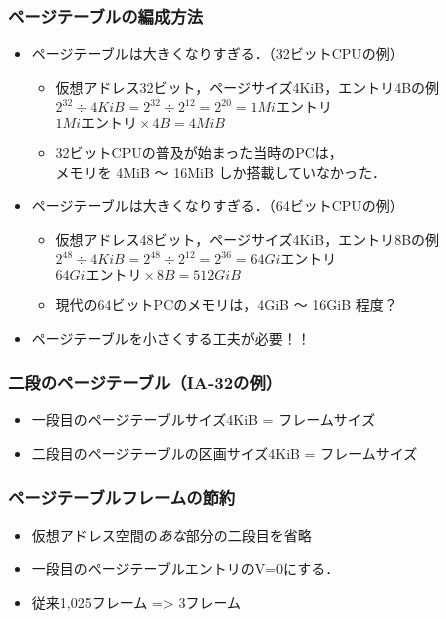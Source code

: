 \documentclass[unicode,handout]{beamer}                   %
\begin{document}
\begin{frame}
  \frametitle{ページテーブルの編成方法}
  \begin{itemize}
  \item ページテーブルは大きくなりすぎる．（32ビットCPUの例）
    \begin{itemize}
      \item 仮想アドレス32ビット，ページサイズ4KiB，エントリ4Bの例 \\
        $2^{32} \div 4KiB = 2^{32} \div 2^{12} = 2^{20} = 1Mi$エントリ\\
        $1Mi エントリ \times 4B = 4MiB$
      \item 32ビットCPUの普及が始まった当時のPCは， \\
        メモリを 4MiB 〜 16MiB しか搭載していなかった．
    \end{itemize}
    \vfill
  \item ページテーブルは大きくなりすぎる．（64ビットCPUの例）
    \begin{itemize}
      \item 仮想アドレス48ビット，ページサイズ4KiB，エントリ8Bの例 \\
        $2^{48} \div 4KiB = 2^{48} \div 2^{12} = 2^{36} = 64Gi$エントリ\\
        $64Gi エントリ \times 8B = 512GiB$
      \item 現代の64ビットPCのメモリは，4GiB 〜 16GiB 程度？
    \end{itemize}
    \vfill
  \item ページテーブルを小さくする工夫が必要！！
  \end{itemize}
\end{frame}

\begin{frame}
  \frametitle{二段のページテーブル（IA-32の例）}
  \begin{itemize}
  \item 一段目のページテーブルサイズ4KiB = フレームサイズ
  \item 二段目のページテーブルの区画サイズ4KiB = フレームサイズ
  \end{itemize}
\end{frame}

\begin{frame}
  \frametitle{ページテーブルフレームの節約}
  \begin{itemize}
  \item 仮想アドレス空間の\emph{あな}部分の二段目を省略
  \item 一段目のページテーブルエントリのV=0にする．
  \item 従来1,025フレーム => 3フレーム
  \end{itemize}
\end{frame}
\end{document}
